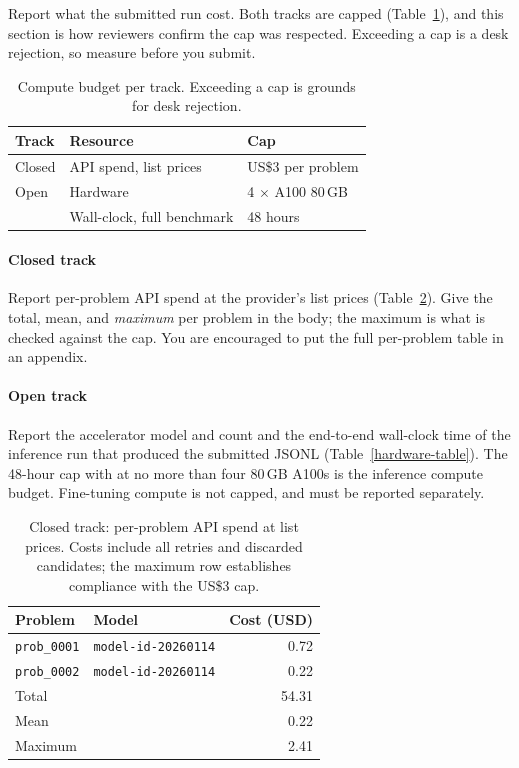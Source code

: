 \documentclass{article}
\begin{document}
Report what the submitted run cost. Both tracks are capped (Table~\ref{limits-table}), and this section is how reviewers confirm the cap was respected. Exceeding a cap is a desk rejection, so measure before you submit.


\begin{table}[!ht]
  \caption{Compute budget per track. Exceeding a cap is grounds for desk rejection.}
  \label{limits-table}
  \centering
  \begin{tabular}{lll}
    \toprule
    Track  & Resource                    & Cap \\
    \midrule
    Closed & API spend, list prices      & US\$3 per problem \\
    Open   & Hardware                    & 4 $\times$ A100 80\,GB \\
           & Wall-clock, full benchmark  & 48 hours \\
    \bottomrule
  \end{tabular}
\end{table}


\paragraph{Closed track} Report per-problem API spend at the provider's list prices (Table~\ref{budget-table}). Give the total, mean, and \emph{maximum} per problem in the body; the maximum is what is checked against the cap. You are encouraged to put the full per-problem table in an appendix.

\paragraph{Open track} Report the accelerator model and count and the end-to-end wall-clock time of the inference run that produced the submitted JSONL (Table~\ref{hardware-table}). The 48-hour cap with  at no more than four 80\,GB A100s is the inference compute budget. Fine-tuning compute is not capped, and must be reported separately.


\begin{table}[!ht]
  \caption{Closed track: per-problem API spend at list prices. Costs include all retries and discarded candidates; the maximum row establishes compliance with the US\$3 cap.}
  \label{budget-table}
  \centering
  \begin{tabular}{llr}
    \toprule
    Problem & Model & Cost (USD) \\
    \midrule
    \texttt{prob\_0001} & \texttt{model-id-20260114} & 0.72 \\
    \texttt{prob\_0002} & \texttt{model-id-20260114} & 0.22 \\
    \midrule
    Total   &                            & 54.31 \\
    Mean    &                            &  0.22 \\
    Maximum &                            &  2.41 \\
    \bottomrule
  \end{tabular}
\end{table}
\end{document}
